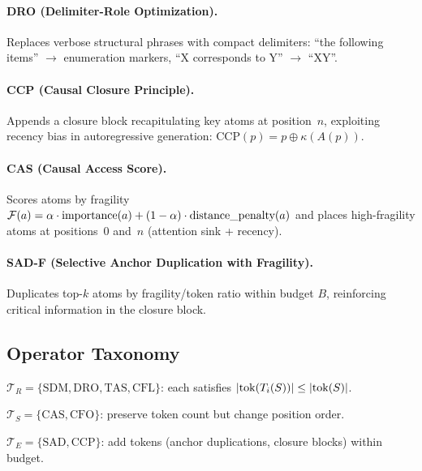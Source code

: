 \paragraph{DRO (Delimiter-Role Optimization).}
Replaces verbose structural phrases with compact delimiters: ``the following items'' $\to$ enumeration markers, ``X corresponds to Y'' $\to$ ``X\textrightarrow Y''.

\paragraph{CCP (Causal Closure Principle).}
Appends a closure block recapitulating key atoms at position~$n$, exploiting recency bias in autoregressive generation: $\text{CCP}(p) = p \oplus \kappa(A(p))$.

\paragraph{CAS (Causal Access Score).}
Scores atoms by fragility $\mathcal{F}(a) = \alpha \cdot \text{importance}(a) + (1-\alpha) \cdot \text{distance\_penalty}(a)$ and places high-fragility atoms at positions~0 and~$n$ (attention sink + recency).

\paragraph{SAD-F (Selective Anchor Duplication with Fragility).}
Duplicates top-$k$ atoms by fragility/token ratio within budget $B$, reinforcing critical information in the closure block.



\subsection{Operator Taxonomy}

\begin{definition}
\label{def:token-reducing}
$\mathcal{T}_R = \{\text{SDM}, \text{DRO}, \text{TAS}, \text{CFL}\}$: each satisfies $|\mathrm{tok}(T_i(S))| \leq |\mathrm{tok}(S)|$.
\end{definition}

\begin{definition}
\label{def:structure-reordering}
$\mathcal{T}_S = \{\text{CAS}, \text{CFO}\}$: preserve token count but change position order.
\end{definition}

\begin{definition}
\label{def:token-expanding}
$\mathcal{T}_E = \{\text{SAD}, \text{CCP}\}$: add tokens (anchor duplications, closure blocks) within budget.
\end{definition}

